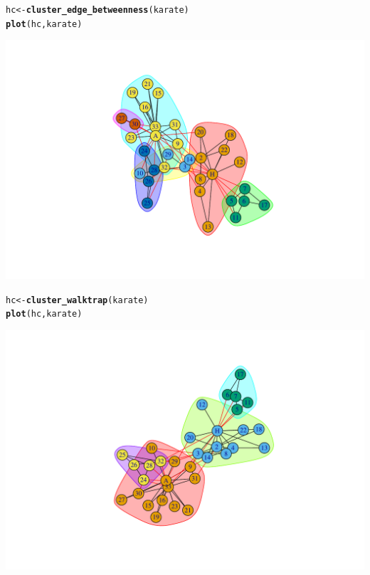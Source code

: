 \documentclass{beamer}\usepackage[]{graphicx}\usepackage[]{color}
\makeatletter
\newcommand{\hlstd}[1]{\textcolor[rgb]{0.345,0.345,0.345}{#1}}%
\newcommand{\hlkwb}[1]{\textcolor[rgb]{0.69,0.353,0.396}{#1}}%
\newcommand{\hlkwd}[1]{\textcolor[rgb]{0.737,0.353,0.396}{\textbf{#1}}}%
\newenvironment{kframe}{%
 \def\at@end@of@kframe{}%
 \ifinner\ifhmode%
  \def\at@end@of@kframe{\end{minipage}}%
  \begin{minipage}{\columnwidth}%
 \fi\fi%
 \def\FrameCommand##1{\hskip\@totalleftmargin \hskip-\fboxsep
 \colorbox{shadecolor}{##1}\hskip-\fboxsep
     \hskip-\linewidth \hskip-\@totalleftmargin \hskip\columnwidth}%
 \MakeFramed {\advance\hsize-\width
   \@totalleftmargin\z@ \linewidth\hsize
   \@setminipage}}%
 {\par\unskip\endMakeFramed%
 \at@end@of@kframe}
\newenvironment{knitrout}{}{} %
\makeatother
\begin{document}
\begin{frame}
\begin{knitrout}
\end{knitrout}

\begin{knitrout}\scriptsize
{}\color{fgcolor}\begin{kframe}
\begin{alltt}
\hlstd{hc} \hlkwb{<-} \hlkwd{cluster_edge_betweenness}\hlstd{(karate)}
\hlkwd{plot}\hlstd{(hc,karate)}
\end{alltt}
\end{kframe}
\includegraphics[width=.8\textwidth]{figures/unnamed-chunk-3-1} 

\end{knitrout}

\begin{knitrout}\scriptsize
{}\color{fgcolor}\begin{kframe}
\begin{alltt}
\hlstd{hc} \hlkwb{<-} \hlkwd{cluster_walktrap}\hlstd{(karate)}
\hlkwd{plot}\hlstd{(hc,karate)}
\end{alltt}
\end{kframe}
\includegraphics[width=.8\textwidth]{figures/unnamed-chunk-4-1} 

\end{knitrout}

\end{frame}
\end{document}
